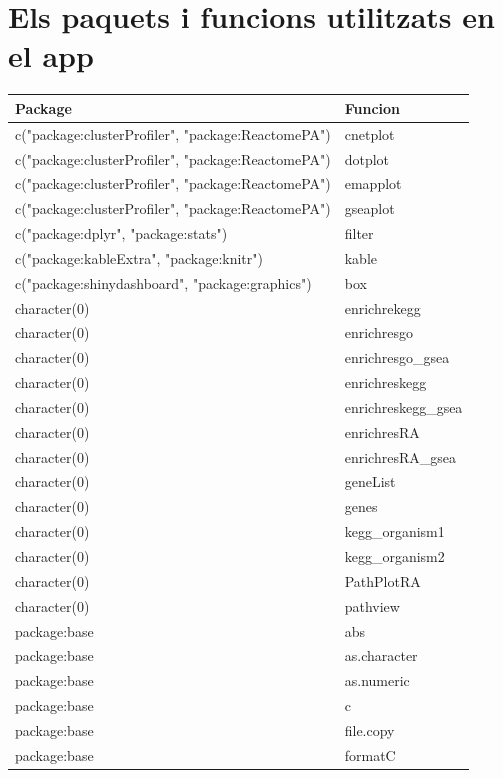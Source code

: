 \documentclass[]{article}
\begin{document}
\section{Els paquets i funcions utilitzats en el app}
\label{sec:A1}
\begingroup\fontsize{8}{10}\selectfont
\begin{longtable}{ll}
\toprule
Package & Funcion\\
\midrule
\rowcolor{gray!6} c("package:clusterProfiler", "package:ReactomePA") & cnetplot\\
c("package:clusterProfiler", "package:ReactomePA") & dotplot\\
\rowcolor{gray!6} c("package:clusterProfiler", "package:ReactomePA") & emapplot\\
c("package:clusterProfiler", "package:ReactomePA") & gseaplot\\
\rowcolor{gray!6} c("package:dplyr", "package:stats") & filter\\
c("package:kableExtra", "package:knitr") & kable\\
\rowcolor{gray!6} c("package:shinydashboard", "package:graphics") & box\\
character(0) & enrichrekegg\\
\rowcolor{gray!6} character(0) & enrichresgo\\
character(0) & enrichresgo\_gsea\\
\rowcolor{gray!6} character(0) & enrichreskegg\\
character(0) & enrichreskegg\_gsea\\
\rowcolor{gray!6} character(0) & enrichresRA\\
character(0) & enrichresRA\_gsea\\
\rowcolor{gray!6} character(0) & geneList\\
character(0) & genes\\
\rowcolor{gray!6} character(0) & kegg\_organism1\\
character(0) & kegg\_organism2\\
\rowcolor{gray!6} character(0) & PathPlotRA\\
character(0) & pathview\\
\rowcolor{gray!6} package:base & abs\\
package:base & as.character\\
\rowcolor{gray!6} package:base & as.numeric\\
package:base & c\\
\rowcolor{gray!6} package:base & file.copy\\
package:base & formatC\\

\end{longtable}
\end{document}
